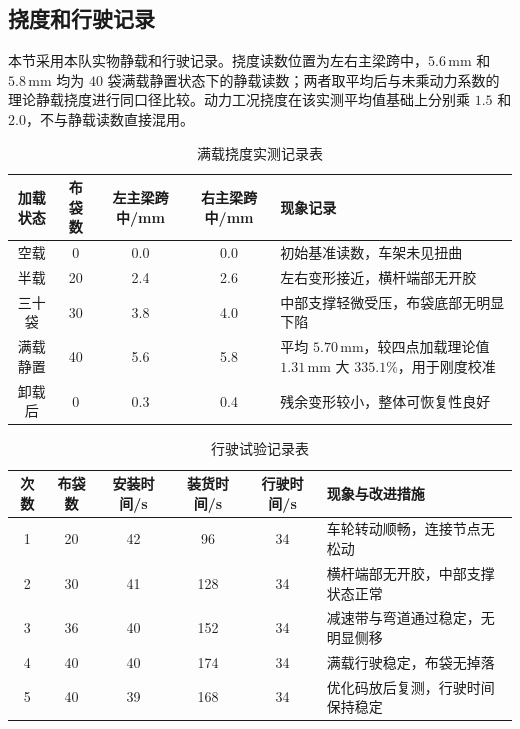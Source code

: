 \documentclass[UTF8,a4paper,12pt,fontset=none]{ctexart}
\numberwithin{equation}{section}
\numberwithin{figure}{section}
\numberwithin{table}{section}
\newcommand{\mm}{\,\mathrm{mm}}
\begin{document}
\subsection{挠度和行驶记录}
本节采用本队实物静载和行驶记录。挠度读数位置为左右主梁跨中，$5.6\mm$ 和 $5.8\mm$ 均为 $40$ 袋满载静置状态下的静载读数；两者取平均后与未乘动力系数的理论静载挠度进行同口径比较。动力工况挠度在该实测平均值基础上分别乘 $1.5$ 和 $2.0$，不与静载读数直接混用。
\begin{table}[H]
\centering
\caption{满载挠度实测记录表}
\label{tab:deflection-record}
\begin{tabularx}{\linewidth}{c c c c Y}
\toprule
\textbf{加载状态} & \textbf{布袋数} & \textbf{左主梁跨中}/mm & \textbf{右主梁跨中}/mm & \textbf{现象记录} \\\midrule
空载 & 0 & 0.0 & 0.0 & 初始基准读数，车架未见扭曲 \\
半载 & 20 & 2.4 & 2.6 & 左右变形接近，横杆端部无开胶 \\
三十袋 & 30 & 3.8 & 4.0 & 中部支撑轻微受压，布袋底部无明显下陷 \\
满载静置 & 40 & 5.6 & 5.8 & 平均 $5.70\mm$，较四点加载理论值 $1.31\mm$ 大 $335.1\%$，用于刚度校准 \\
卸载后 & 0 & 0.3 & 0.4 & 残余变形较小，整体可恢复性良好 \\
\bottomrule
\end{tabularx}
\end{table}

\begin{table}[H]
\centering
\caption{行驶试验记录表}
\label{tab:run-record}
\begin{tabularx}{\linewidth}{c c c c c Y}
\toprule
\textbf{次数} & \textbf{布袋数} & \textbf{安装时间}/s & \textbf{装货时间}/s & \textbf{行驶时间}/s & \textbf{现象与改进措施} \\ & 20 & 42 & 96 & 34 & 车轮转动顺畅，连接节点无松动 \\
2 & 30 & 41 & 128 & 34 & 横杆端部无开胶，中部支撑状态正常 \\
3 & 36 & 40 & 152 & 34 & 减速带与弯道通过稳定，无明显侧移 \\
4 & 40 & 40 & 174 & 34 & 满载行驶稳定，布袋无掉落 \\
5 & 40 & 39 & 168 & 34 & 优化码放后复测，行驶时间保持稳定 \\
\bottomrule
\end{tabularx}
\end{table}
\end{document}
